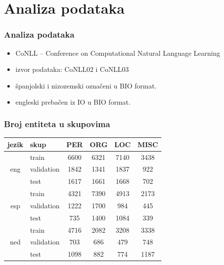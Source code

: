 \documentclass{beamer}
\begin{document}
\section{Analiza podataka}
\begin{frame}
\frametitle{Analiza podataka}

\begin{itemize}
\item CoNLL -- Conference on Computational Natural Language Learning
\item izvor podataka: CoNLL02 i CoNLL03 
\item španjolski i nizozemski označeni u BIO format.
\item engleski prebačen iz IO u BIO format.
\end{itemize}
\end{frame}




\begin{frame}
\frametitle{Broj entiteta u skupovima}
\begin{center}
\begin{tabular}{ clcccc }
\hline
\textbf{jezik} & \textbf{skup} & \textbf{PER} & \textbf{ORG} & \textbf{LOC} & \textbf{MISC} \\ \hline
\multirow{3}{*}{eng} & train & 6600 & 6321 & 7140 & 3438 \\
 & validation & 1842 & 1341 & 1837 & 922 \\
 & test & 1617 & 1661 & 1668 & 702 \\ \hline
\multirow{3}{*}{esp} & train & 4321 & 7390 & 4913 & 2173 \\
 & validation & 1222 & 1700 & 984 & 445\\
 & test & 735 & 1400 & 1084  & 339 \\ \hline
\multirow{3}{*}{ned} & train & 4716 & 2082 & 3208 & 3338 \\
 & validation & 703 & 686 & 479 & 748 \\
 & test & 1098 & 882 & 774 & 1187 \\ \hline
\end{tabular}
\end{center}\end{frame}
\end{document}
